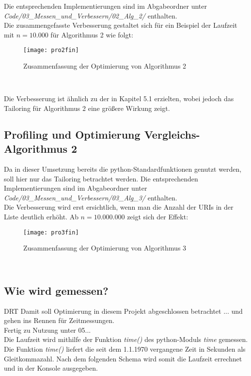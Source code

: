 \documentclass[
10pt, %
a4paper, %
oneside, %
headinclude,footinclude, %
BCOR5mm, %
]{scrartcl}
\begin{document}
Die entsprechenden Implementierungen sind im Abgabeordner unter\\ \textit{Code/03\_Messen\_und\_Verbessern/02\_Alg\_2/} enthalten.\\

Die zusammengefasste Verbesserung gestaltet sich für ein Beispiel der Laufzeit mit \(n=10.000\) für Algorithmus 2 wie folgt:\\
\begin{figure}[h!]
	\centering 
	\texttt{[image: pro2fin]} 
	\caption[Zusammenfassung Optimierung Alg. 2]{Zusammenfassung der Optimierung von Algorithmus 2}
\end{figure}\

Die Verbesserung ist ähnlich zu der in Kapitel 5.1 erzielten, wobei jedoch das Tailoring für Algorithmus 2 eine größere Wirkung zeigt.

\subsection{Profiling und Optimierung Vergleichs-Algorithmus 2}
Da in dieser Umsetzung bereits die python-Standardfunktionen genutzt werden, soll hier nur das Tailoring betrachtet werden. Die entsprechenden Implementierungen sind im Abgabeordner unter \textit{Code/03\_Messen\_und\_Verbessern/03\_Alg\_3/} enthalten.\\

Die Verbesserung wird erst ersichtlich, wenn man die Anzahl der URIs in der Liste deutlich erhöht. Ab \(n=10.000.000\) zeigt sich der Effekt:\\
\begin{figure}[h!]
	\centering 
	\texttt{[image: pro3fin]} 
	\caption[Zusammenfassung Optimierung Alg. 3]{Zusammenfassung der Optimierung von Algorithmus 3}
\end{figure}\


\subsection{Wie wird gemessen?}
DRT
Damit soll Optimierung in diesem Projekt abgeschlossen betrachtet ... und gehen ins Rennen für Zeitmessungen.\\
Fertig zu Nutzung unter 05...\\

Die Laufzeit wird mithilfe der Funktion \textit{time() }des python-Moduls \textit{time} gemessen. Die Funktion \textit{time()} liefert die seit dem 1.1.1970 vergangene Zeit in Sekunden als Gleitkommazahl. \cite{TIME} Nach dem folgenden Schema wird somit die Laufzeit errechnet und in der Konsole ausgegeben.\\

\end{document}
